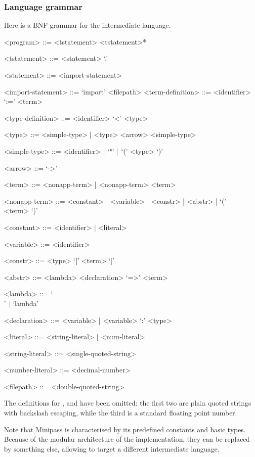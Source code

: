 \documentclass[main.tex]{subfiles}
\begin{document}
\subsubsection{Language grammar}
\label{minipass:grammar}
Here is a BNF grammar for the intermediate language.
\begin{grammar}
    <program> ::= <tstatement> <tstatement>*

    <tstatement> ::= <statement> `.'

    <statement>  ::= <import-statement>

    <import-statement> ::= `import' <filepath>
    <term-definition>  ::= <identifier> `:=' <term>

    <type-definition>  ::= <identifier> `<' <type>

    <type> ::= <simple-type> | <type> <arrow> <simple-type>

    <simple-type> ::= <identifier> | `*' | `(' <type> `)'

    <arrow> ::= `->'

    <term> ::= <nonapp-term> | <nonapp-term> <term>

    <nonapp-term> ::= <constant> | <variable> | <constr> | <abstr> | `(' <term> `)'

    <constant> ::= <identifier> | <literal>

    <variable> ::= <identifier>

    <constr> ::= <type> `[' <term> `]'

    <abstr> ::= <lambda> <declaration> `=>' <term>

    <lambda> ::= `\\' | `lambda'

    <declaration> ::= <variable> | <variable> `:' <type>

    <literal> ::= <string-literal> | <num-literal>
    
    <string-literal> ::= <single-quoted-string>
    
    <number-literal> ::= <decimal-number>

    <filepath> ::= <double-quoted-string>
\end{grammar}

The definitions for ,
and 
have been omitted: the first two are plain quoted strings with backslash escaping,
while the third is a standard floating point number.

Note that Minipass is characterised by its predefined constants and basic
types. Because of the modular architecture of the implementation, they can be
replaced by something else, allowing to target a different intermediate language.
\end{document}
